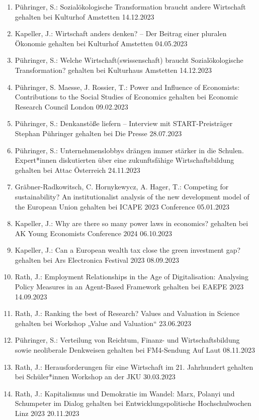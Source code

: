 \begin{enumerate}
	\item Pühringer, S.: Sozialökologische Transformation braucht andere Wirtschaft gehalten bei Kulturhof Amstetten 14.12.2023
	\item Kapeller, J.: Wirtschaft anders denken? – Der Beitrag einer pluralen Ökonomie gehalten bei Kulturhof Amstetten 04.05.2023
	\item Pühringer, S.: Welche Wirtschaft(swissenschaft) braucht Sozialökologische Transformation? gehalten bei Kulturhaus Amstetten 14.12.2023
	\item Pühringer, S. Maesse, J. Rossier, T.: Power and Influence of Economists: Contributions to the Social Studies of Economics gehalten bei Economic Research Council London 09.02.2023
	\item Pühringer, S.: Denkanstöße liefern -- Interview mit START-Preisträger Stephan Pühringer gehalten bei Die Presse 28.07.2023
	\item Pühringer, S.: Unternehmenslobbys drängen immer stärker in die Schulen. Expert*innen diskutierten über eine zukunftsfähige Wirtschaftsbildung gehalten bei Attac Österreich 24.11.2023
	\item Gräbner-Radkowitsch, C. Hornykewycz, A. Hager, T.: Competing for sustainability? An institutionalist analysis of the new development model of the European Union gehalten bei ICAPE 2023 Conference 05.01.2023
	\item Kapeller, J.: Why are there so many power laws in economics? gehalten bei AK Young Economists Conference 2024 06.10.2023
	\item Kapeller, J.: Can a European wealth tax close the green investment gap? gehalten bei Ars Electronica Festival 2023 08.09.2023
	\item Rath, J.: Employment Relationships in the Age of Digitalisation: Analysing Policy Measures in an Agent-Based Framework gehalten bei EAEPE 2023 14.09.2023
	\item Rath, J.: Ranking the best of Research? Values and Valuation in Science gehalten bei Workshop „Value and Valuation“ 23.06.2023
	\item Pühringer, S.: Verteilung von Reichtum, Finanz- und Wirtschaftsbildung sowie neoliberale Denkweisen gehalten bei FM4-Sendung \glqq Auf Laut\grqq{} 08.11.2023
	\item Rath, J.: Herausforderungen für eine Wirtschaft im 21. Jahrhundert gehalten bei Schüler*innen Workshop an der JKU 30.03.2023
	\item Rath, J.: Kapitalismus und Demokratie im Wandel: Marx, Polanyi und Schumpeter im Dialog gehalten bei Entwicklungspolitische Hochschulwochen Linz 2023 20.11.2023

\end{enumerate}
